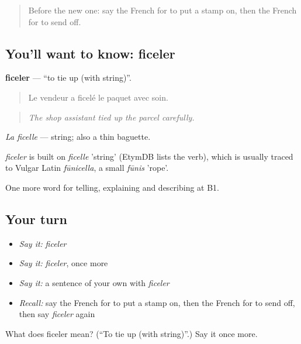 \label{lesson:FR-C449-ficeler}



\begin{quote}
Before the new one: say the French for to put a stamp on, then the French for to send off.
\end{quote}

\subsection*{You'll want to know: ficeler}
\textbf{ficeler} — \textquotedblleft{}to tie up (with string)\textquotedblright{}.

\begin{quote}
Le vendeur a ficelé le paquet avec soin.
\end{quote}

\begin{quote}
\emph{The shop assistant tied up the parcel carefully.}
\end{quote}

\emph{La ficelle} — string; also a thin baguette.

\begin{cousinweb}
\emph{ficeler} is built on \emph{ficelle} 'string' (EtymDB lists the verb), which is usually traced to Vulgar Latin \emph{fūnicella}, a small \emph{fūnis} 'rope'.
\end{cousinweb}

\begin{grammarlens}[title={What you've built}]
One more word for telling, explaining and describing at B1.
\end{grammarlens}

\subsection*{Your turn}
\begin{itemize}
\raggedright
  \item \emph{Say it:} \emph{ficeler}
  \item \emph{Say it:} \emph{ficeler}, once more
  \item \emph{Say it:} a sentence of your own with \emph{ficeler}
  \item \emph{Recall:} say the French for to put a stamp on, then the French for to send off, then say \emph{ficeler} again
\end{itemize}

\begin{tcolorbox}[breakable,colback=teal!4,colframe=teal!35!black,title={Before you move on}]
What does ficeler mean? (\textquotedblleft{}To tie up (with string)\textquotedblright{}.) Say it once more.
\end{tcolorbox}
